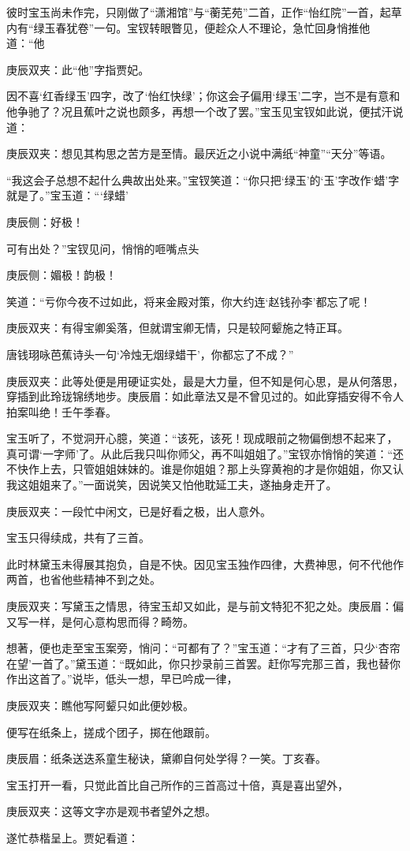 \begin{parag}
    彼时宝玉尚未作完，只刚做了“潇湘馆”与“蘅芜苑”二首，正作“怡红院”一首，起草内有“绿玉春犹卷”一句。宝钗转眼瞥见，便趁众人不理论，急忙回身悄推他道：“他\begin{note}庚辰双夹：此“他”字指贾妃。\end{note}因不喜‘红香绿玉’四字，改了‘怡红快绿’；你这会子偏用‘绿玉’二字，岂不是有意和他争驰了？况且蕉叶之说也颇多，再想一个改了罢。”宝玉见宝钗如此说，便拭汗说道：\begin{note}庚辰双夹：想见其构思之苦方是至情。最厌近之小说中满纸“神童”“天分”等语。\end{note}“我这会子总想不起什么典故出处来。”宝钗笑道：“你只把‘绿玉’的‘玉’字改作‘蜡’字就是了。”宝玉道：“‘绿蜡’\begin{note}庚辰侧：好极！\end{note}可有出处？”宝钗见问，悄悄的咂嘴点头\begin{note}庚辰侧：媚极！韵极！\end{note}笑道：“亏你今夜不过如此，将来金殿对策，你大约连‘赵钱孙李’都忘了呢！\begin{note}庚辰双夹：有得宝卿奚落，但就谓宝卿无情，只是较阿颦施之特正耳。\end{note}唐钱珝咏芭蕉诗头一句‘冷烛无烟绿蜡干’，你都忘了不成？”\begin{note}庚辰双夹：此等处便是用硬证实处，最是大力量，但不知是何心思，是从何落思，穿插到此玲珑锦绣地步。庚辰眉：如此章法又是不曾见过的。如此穿插安得不令人拍案叫绝！壬午季春。\end{note}宝玉听了，不觉洞开心臆，笑道：“该死，该死！现成眼前之物偏倒想不起来了，真可谓‘一字师’了。从此后我只叫你师父，再不叫姐姐了。”宝钗亦悄悄的笑道：“还不快作上去，只管姐姐妹妹的。谁是你姐姐？那上头穿黄袍的才是你姐姐，你又认我这姐姐来了。”一面说笑，因说笑又怕他耽延工夫，遂抽身走开了。\begin{note}庚辰双夹：一段忙中闲文，已是好看之极，出人意外。\end{note}宝玉只得续成，共有了三首。
\end{parag}


\begin{parag}
    此时林黛玉未得展其抱负，自是不快。因见宝玉独作四律，大费神思，何不代他作两首，也省他些精神不到之处。\begin{note}庚辰双夹：写黛玉之情思，待宝玉却又如此，是与前文特犯不犯之处。庚辰眉：偏又写一样，是何心意构思而得？畸笏。\end{note}想著，便也走至宝玉案旁，悄问：“可都有了？”宝玉道：“才有了三首，只少‘杏帘在望’一首了。”黛玉道：“既如此，你只抄录前三首罢。赶你写完那三首，我也替你作出这首了。”说毕，低头一想，早已吟成一律，\begin{note}庚辰双夹：瞧他写阿颦只如此便妙极。\end{note}便写在纸条上，搓成个团子，掷在他跟前。\begin{note}庚辰眉：纸条送迭系童生秘诀，黛卿自何处学得？一笑。丁亥春。\end{note}宝玉打开一看，只觉此首比自己所作的三首高过十倍，真是喜出望外，\begin{note}庚辰双夹：这等文字亦是观书者望外之想。\end{note}遂忙恭楷呈上。贾妃看道：
\end{parag}


